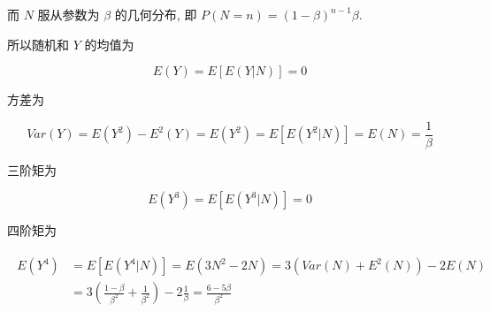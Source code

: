 \documentclass[boxes]{homework}
\begin{document}
\begin{solution}
    而 $N$ 服从参数为 $\beta$ 的几何分布, 即 $P(N=n)=(1-\beta)^{n-1}\beta$.
    
    所以随机和 $Y$ 的均值为

    \begin{equation}
        E(Y)=E[E(Y|N)]=0
    \end{equation}

    方差为

    \begin{equation}
        Var(Y)=E(Y^2)-E^2(Y)=E(Y^2)=E[E(Y^2|N)]=E(N)=\frac{1}{\beta}
    \end{equation}

    三阶矩为

    \begin{equation}
        E(Y^3)=E[E(Y^3|N)]=0
    \end{equation}

    四阶矩为

    \begin{align}
        \begin{aligned}
            E(Y^4)&=E[E(Y^4|N)]=E(3N^2-2N)=3(Var(N)+E^2(N))-2E(N)\\
            &=3\left(\frac{1-\beta}{\beta^2}+\frac{1}{\beta^2}\right)-2\frac{1}{\beta}=\frac{6-5\beta}{\beta^2}
        \end{aligned}
    \end{align}
\end{solution}
\end{document}
